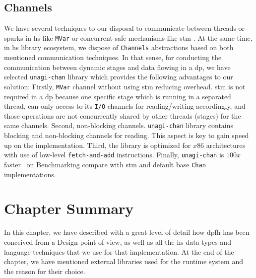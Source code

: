 \subsection{Channels\label{section:channels}} 
We have several techniques to our disposal to communicate between threads or sparks in \acrshort{hs} like \texttt{MVar} or concurrent safe mechanisms like \acrfull{stm} \cite{stm}. 
At the same time, in \acrshort{hs} library ecosystem, we dispose of \texttt{Channels} abstractions based on both mentioned communication techniques. 
In that sense, for conducting the communication between dynamic stages and data flowing in a \acrshort{dp}, we have selected \texttt{unagi-chan} library \cite{unagi} which provides the following advantages to our solution: Firstly, \texttt{MVar} channel without using \acrshort{stm} reducing overhead. 
\acrshort{stm} is not required in a \acrshort{dp} because one specific stage which is running in a separated thread, can only access to its \texttt{I/O} channels for reading/writing accordingly, and those operations are not concurrently shared by other threads (stages) for the same channels. 
Second, non-blocking channels. \texttt{unagi-chan} library contains blocking and non-blocking channels for reading. This aspect is key to gain speed up on the implementation. Third, the library is optimized for $x86$ architectures with use of low-level \texttt{fetch-and-add} instructions. Finally, \texttt{unagi-chan} is $100x$ faster~\cite{unagi-bench} on Benchmarking compare with \acrshort{stm} and default base \texttt{Chan} implementations.

\section{Chapter Summary}
In this chapter, we have described with a great level of detail how \acrlong{dpfh} has been conceived from a Design point of view, 
as well as all the \acrshort{hs} data types and language techniques that we use for that implementation. 
At the end of the chapter, we have mentioned external libraries used for the runtime system and the reason for their choice.
